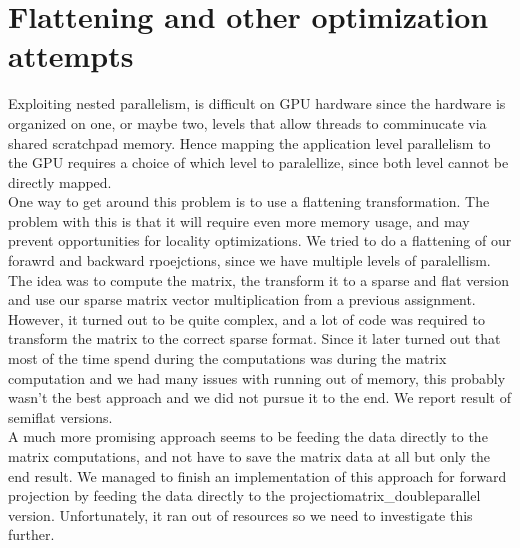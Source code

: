 \section{Flattening and other optimization attempts}
Exploiting nested parallelism, is difficult on GPU hardware since the hardware is organized on one, or maybe two, levels that allow threads to comminucate via shared scratchpad memory. Hence mapping the application level parallelism to the GPU requires a choice of which level to paralellize, since both level cannot be directly mapped.\\
One way to get around this problem is to use a flattening transformation. The problem with this is that it will require even more memory usage, and may prevent opportunities for locality optimizations. We tried to do a flattening of our forawrd and backward rpoejctions, since we have multiple levels of paralellism. The idea was to compute the matrix, the transform it to a sparse and flat version and use our sparse matrix vector multiplication from a previous assignment. However, it turned out to be quite complex, and a lot of code was required to transform the matrix to the correct sparse format. Since it later turned out that most of the time spend during the computations was during the matrix computation and we had many issues with running out of memory, this probably wasn't the best approach and we did not pursue it to the end. We report result of semiflat versions.\\
A much more promising approach seems to be feeding the data directly to the matrix computations, and not have to save the matrix data at all but only the end result. We managed to finish an implementation of this approach for forward projection by feeding the data directly to the projectiomatrix\_doubleparallel version. Unfortunately, it ran out of resources so we need to investigate this further.\\
